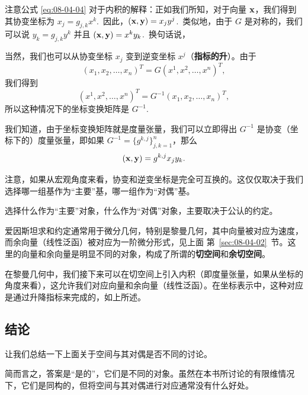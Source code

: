 注意公式 \eqref{eq:08-04-04} 对于内积的解释：正如我们所知，对于向量 $\mathbf{x}$，我们得到其协变坐标为 $x_j = g_{j,k} x^k$.~因此，$(\mathbf{x}, \mathbf{y}) = x_j y^j$.~类似地，由于 $G$ 是对称的，我们可以说 $y_k = g_{j,k} y^k$ 并且 $(\mathbf{x}, \mathbf{y}) = x^k y_k$.~换句话说，




当然，我们也可以从协变坐标 $x_j$ 变到逆变坐标 $x^j$（\textbf{指标的升}）。由于
$$(x_1, x_2, \dots, x_n)^T = G(x^1, x^2, \dots, x^n)^T,$$
我们得到
$$(x^1, x^2, \dots, x^n)^T = G^{-1}(x_1, x_2, \dots, x_n)^T,$$
所以这种情况下的坐标变换矩阵是 $G^{-1}$.~

我们知道，由于坐标变换矩阵就是度量张量，我们可以立即得出 $G^{-1}$ 是协变（坐标下的）度量张量，即如果 $G^{-1} = \{g^{k,j}\}^{n}_{j,k=1}$，那么
 $$(\mathbf{x}, \mathbf{y}) = g^{k,j} x_j y_k.$$

\begin{remark*}
注意，如果从宏观角度来看，协变和逆变坐标是完全可互换的。这仅仅取决于我们选择哪一组基作为“主要”基，哪一组作为“对偶”基。
\end{remark*}

选择什么作为“主要”对象，什么作为“对偶”对象，主要取决于公认的约定。

\begin{remark}\label{stmt:08-04-01}
爱因斯坦求和约定通常用于微分几何，特别是黎曼几何，其中向量被对应为速度，而余向量（线性泛函）被对应为一阶微分形式，见上面 第~\ref{sec:08-04-02}~节。这里的向量和余向量是明显不同的对象，构成了所谓的\textbf{切空间}和\textbf{余切空间}。
\end{remark}

在黎曼几何中，我们接下来可以在切空间上引入内积（即度量张量，如果从坐标的角度来看），这允许我们对应向量和余向量（线性泛函）。在坐标表示中，这种对应是通过升降指标来完成的，如上所述。

\subsection{结论}\label{sec:08-04-04}

让我们总结一下上面关于空间与其对偶是否不同的讨论。

简而言之，答案是“是的”，它们是不同的对象。虽然在本书所讨论的有限维情况下，它们是同构的，但将空间与其对偶进行对应通常没有什么好处。

